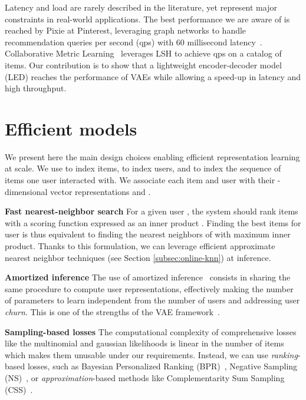 \documentclass[sigconf]{acmart}
\begin{document}
Latency and load are rarely described in the literature, yet represent major constraints in real-world applications. The best performance we are aware of is reached by Pixie at Pinterest, leveraging graph networks to handle  recommendation queries per second (qps) with 60 millisecond latency~\cite{pixie-pinterest-www-2018}. Collaborative Metric Learning~\cite{cml-www} leverages LSH to achieve  qps on a catalog of  items. Our contribution is to show that a lightweight encoder-decoder model (LED) reaches the performance of VAEs while allowing a  speed-up in latency and high throughput.



\section{Efficient models}
\label{sec:models}

We present here the main design choices enabling efficient representation learning at scale. We use  to index items,  to index users, and   to index the sequence of items one user interacted with. We associate each item  and user  with their -dimensional vector representations  and .



\textbf{Fast nearest-neighbor search} For a given user , the system should rank items with a scoring function expressed as an inner product . Finding the  best items for user  is thus equivalent to finding the  nearest neighbors of  with maximum inner product. Thanks to this formulation, we can leverage efficient approximate nearest neighbor techniques (see Section \ref{subsec:online-knn}) at inference.

\textbf{Amortized inference} The use of amortized inference~\cite{amortized-inference} consists in sharing the same procedure to compute user representations, effectively making the number of parameters to learn independent from the number of users and addressing user \emph{churn}. This is one of the strengths of the VAE framework~\cite{ract-cf}.

\textbf{Sampling-based losses} The computational complexity of comprehensive losses like the multinomial and gaussian likelihoods is linear in the number of items which makes them unusable under our requirements. Instead, we can use \emph{ranking}-based losses, such as Bayesian Personalized Ranking (BPR)~\cite{bpr}, Negative Sampling (NS)~\cite{NIPS2013_5021}, or \emph{approximation}-based methods like Complementarity Sum Sampling (CSS)~\cite{pmlr-v54-botev17a}. 
\end{document}
